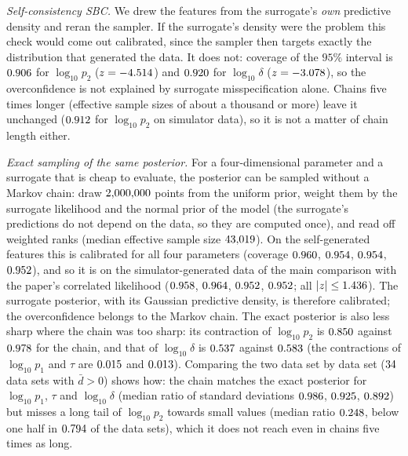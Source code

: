 \documentclass[sn-basic,iicol,pdflatex]{sn-jnl}
\begin{document}
\emph{Self-consistency SBC.} We drew the features from the surrogate's \emph{own} predictive density and reran the sampler. If the surrogate's
density were the problem this check would come out calibrated, since the sampler then targets exactly the distribution that generated the data. It does not:
coverage of the $95\%$ interval is $0.906$ for $\log_{10}p_2$ ($z=-4.514$) and $0.920$ for $\log_{10}\delta$ ($z=-3.078$), so the
overconfidence is not explained by surrogate misspecification alone. Chains five times longer (effective sample sizes of about a thousand or more) leave it unchanged
($0.912$ for $\log_{10}p_2$ on simulator data), so it is not a matter of chain length either.

\emph{Exact sampling of the same posterior.} For a four-dimensional parameter and a surrogate that is cheap to evaluate, the posterior can be sampled without a Markov chain: draw $2{,}000{,}000$ points from the uniform
prior, weight them by the surrogate likelihood and the normal prior of the model (the surrogate's predictions do not depend on the data, so they are computed once), and read off weighted ranks
(median effective sample size $43{,}019$). On the self-generated features this is calibrated for all four parameters (coverage $0.960$, $0.954$,
$0.954$, $0.952$), and so it is on the simulator-generated data of the main comparison with the paper's correlated likelihood ($0.958$,
$0.964$, $0.952$, $0.952$; all $|z|\le1.436$). The surrogate posterior, with its Gaussian predictive density, is therefore calibrated;
the overconfidence belongs to the Markov chain. The exact posterior is also less sharp where the chain was too sharp: its contraction of $\log_{10}p_2$ is $0.850$ against $0.978$ for the chain, and that of $\log_{10}\delta$ is $0.537$ against $0.583$ (the contractions of $\log_{10}p_1$ and $\tau$ are $0.015$ and $0.013$). Comparing the two data set by data set ($34$ data sets with $\bar d>0$) shows how: the chain matches the exact posterior for $\log_{10}p_1$, $\tau$ and $\log_{10}\delta$ (median ratio of standard deviations
$0.986$, $0.925$, $0.892$) but misses a long tail of $\log_{10}p_2$ towards small values (median ratio
$0.248$, below one half in $0.794$ of the data sets), which it does not reach even in chains five times as long.
\end{document}
